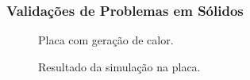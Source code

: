 \documentclass{beamer}
\begin{document}
\begin{frame}
  \frametitle{Validações de Problemas em Sólidos}
  
  \begin{minipage}{.48\textwidth}
    \centering
    \begin{figure}
       {\raggedleft \tiny Placa com geração de calor.}
    \end{figure}
  \end{minipage}
  \hfill
  \begin{minipage}{.48\textwidth}
    \begin{figure}
       {\raggedleft \tiny Resultado da simulação na placa.}
    \end{figure}
  \end{minipage}
  

\end{frame}
\end{document}

